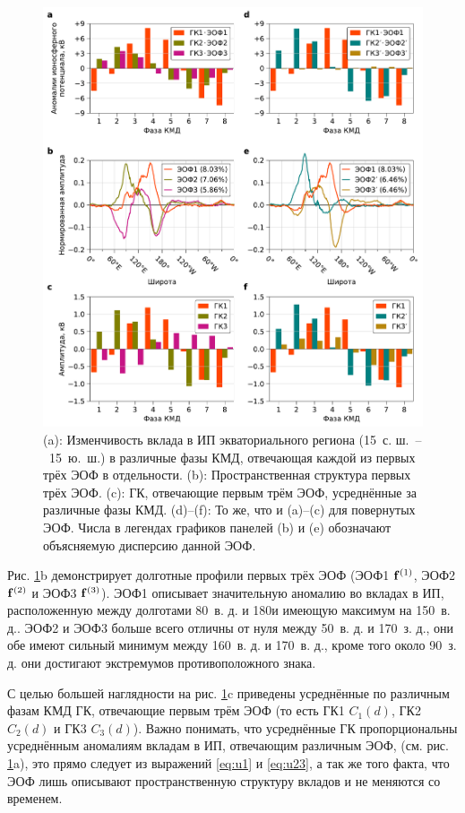 \begin{figure}[htbp]
    \centering
    \includegraphics[width=\textwidth]{figures/eofs_and_pcs.pdf}
    \caption{(a): Изменчивость вклада в ИП экваториального региона (15\textdegree\ с. ш.~--~15\textdegree~ю.~ш.) в различные фазы КМД, отвечающая каждой из первых трёх ЭОФ в отдельности. (b): Пространственная структура первых трёх ЭОФ. (c): ГК, отвечающие первым трём ЭОФ, усреднённые за различные фазы КМД. (d)--(f): То же, что и (a)--(c) для повернутых ЭОФ. Числа в легендах графиков панелей (b) и (e) обозначают объясняемую дисперсию данной ЭОФ.}
    \label{fig:eofs_and_pcs}
\end{figure}

Рис. \ref{fig:eofs_and_pcs}{b} демонстрирует долготные профили первых трёх ЭОФ (ЭОФ1 $\vb{f}^{(1)}$, ЭОФ2 $\vb{f}^{(2)}$ и ЭОФ3 $\vb{f}^{(3)}$). ЭОФ1 описывает значительную аномалию во вкладах в ИП, расположенную между долготами 80\textdegree\ в. д. и 180\textdegree и имеющую максимум на 150\textdegree\ в. д.. ЭОФ2 и ЭОФ3 больше всего отличны от нуля между 50\textdegree\ в. д. и 170\textdegree\ з. д., они обе имеют сильный минимум между 160\textdegree\ в. д. и 170\textdegree\ в. д., кроме того около 90\textdegree\ з. д. они достигают экстремумов противоположного знака.

С целью большей наглядности на рис. \ref{fig:eofs_and_pcs}{c} приведены усреднённые по различным фазам КМД ГК, отвечающие первым трём ЭОФ (то есть ГК1 $C_1(d)$, ГК2 $C_2(d)$ и ГК3 $C_3(d)$). Важно понимать, что усреднённые ГК пропорциональны усреднённым аномалиям вкладам в ИП, отвечающим различным ЭОФ, (см. рис. \ref{fig:eofs_and_pcs}{a}), это прямо следует из выражений \eqref{eq:u1} и \eqref{eq:u23}, а так же того факта, что ЭОФ лишь описывают пространственную структуру вкладов и не меняются со временем.